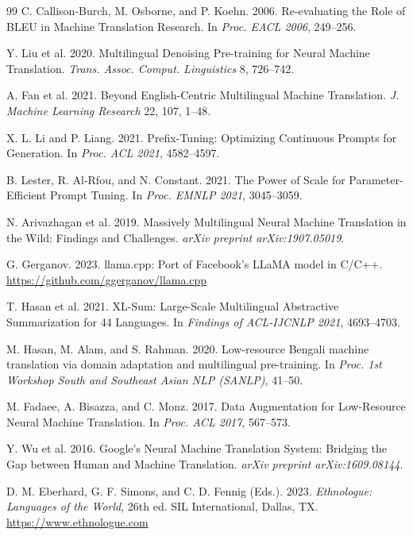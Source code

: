 \documentclass[sigconf]{acmart}
\begin{document}
\begin{thebibliography}{99}
C. Callison-Burch, M. Osborne, and P. Koehn. 2006.
Re-evaluating the Role of BLEU in Machine Translation Research.
In \textit{Proc. EACL 2006}, 249--256.

Y. Liu et al. 2020. Multilingual Denoising Pre-training for Neural Machine Translation.
\textit{Trans. Assoc. Comput. Linguistics} 8, 726--742.

A. Fan et al. 2021. Beyond English-Centric Multilingual Machine Translation.
\textit{J. Machine Learning Research} 22, 107, 1--48.

X. L. Li and P. Liang. 2021. Prefix-Tuning: Optimizing Continuous Prompts for Generation.
In \textit{Proc. ACL 2021}, 4582--4597.

B. Lester, R. Al-Rfou, and N. Constant. 2021.
The Power of Scale for Parameter-Efficient Prompt Tuning.
In \textit{Proc. EMNLP 2021}, 3045--3059.

N. Arivazhagan et al. 2019. Massively Multilingual Neural Machine Translation in the Wild:
Findings and Challenges.
\textit{arXiv preprint arXiv:1907.05019}.

G. Gerganov. 2023. llama.cpp: Port of Facebook's LLaMA model in C/C++.
\url{https://github.com/ggerganov/llama.cpp}

T. Hasan et al. 2021. XL-Sum: Large-Scale Multilingual Abstractive Summarization
for 44 Languages.
In \textit{Findings of ACL-IJCNLP 2021}, 4693--4703.

M. Hasan, M. Alam, and S. Rahman. 2020.
Low-resource Bengali machine translation via domain adaptation and multilingual pre-training.
In \textit{Proc. 1st Workshop South and Southeast Asian NLP (SANLP)}, 41--50.

M. Fadaee, A. Bisazza, and C. Monz. 2017.
Data Augmentation for Low-Resource Neural Machine Translation.
In \textit{Proc. ACL 2017}, 567--573.

Y. Wu et al. 2016. Google's Neural Machine Translation System: Bridging the Gap between
Human and Machine Translation.
\textit{arXiv preprint arXiv:1609.08144}.

D. M. Eberhard, G. F. Simons, and C. D. Fennig (Eds.). 2023.
\textit{Ethnologue: Languages of the World}, 26th ed.
SIL International, Dallas, TX.
\url{https://www.ethnologue.com}


\end{thebibliography}
\end{document}
